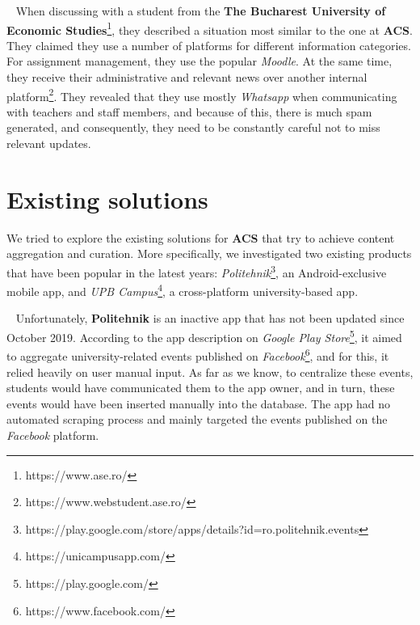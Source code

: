 ~
When discussing with a student from the \textbf{The Bucharest University of Economic Studies}\footnote{https://www.ase.ro/}, they described a situation most similar to the one at \textbf{ACS}. They claimed they use a number of platforms for different information categories. For assignment management, they use the popular \textit{Moodle}. At the same time, they receive their administrative and relevant news over another internal platform\footnote{https://www.webstudent.ase.ro/}. They revealed that they use mostly \textit{Whatsapp} when communicating with teachers and staff members, and because of this, there is much spam generated, and consequently, they need to be constantly careful not to miss relevant updates.


\section{Existing solutions} \label{2:existing_solutions}

We tried to explore the existing solutions for \textbf{ACS} that try to achieve content aggregation and curation. More specifically, we investigated two existing products that have been popular in the latest years: \textit{Politehnik}\footnote{https://play.google.com/store/apps/details?id=ro.politehnik.events}, an Android-exclusive mobile app, and \textit{UPB Campus}\footnote{https://unicampusapp.com/}, a cross-platform university-based app.

~
Unfortunately, \textbf{Politehnik} is an inactive app that has not been updated since October 2019. According to the app description on \textit{Google Play Store}\footnote{https://play.google.com/}, it aimed to aggregate university-related events published on \textit{Facebook}\footnote{https://www.facebook.com/}, and for this, it relied heavily on user manual input. As far as we know, to centralize these events, students would have communicated them to the app owner, and in turn, these events would have been inserted manually into the database. The app had no automated scraping process and mainly targeted the events published on the \textit{Facebook} platform.

